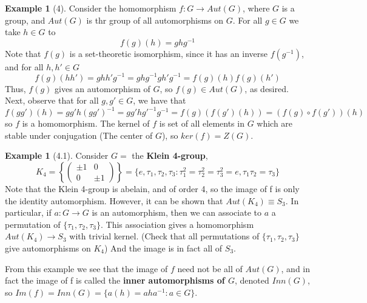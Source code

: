 \documentclass[12pt]{article}
\theoremstyle{definition}
\newtheorem{eg}[thm]{Example}
\theoremstyle{remark}
\numberwithin{equation}{section}
\newcommand\B[1]{\textbf{ #1}}
\begin{document}
\begin{eg}[4]
        Consider the homomorphism $f: G \rightarrow Aut(G)$, where $G$ is a group, and $Aut(G)$ is thr group of all automorphisms on $G$. For all $g \in G$ we take $h\in G$ to \begin{equation}
                f(g)(h) = ghg^{-1}
        \end{equation}
        Note that $f(g)$ is a set-theoretic isomorphism, since it has an inverse $f(g^{-1})$, and for all $h,h' \in G$ $$f(g)(hh') = ghh'g^{-1} = ghg^{-1}gh'g^{-1} = f(g)(h)f(g)(h')$$
        Thus, $f(g)$ gives an automorphism of $G$, so $f(g) \in Aut(G)$, as desired. Next, observe that for all $g,g' \in G$, we have that \begin{equation*}
                f(gg')(h) = gg'h(gg')^{-1} = gg'h{g'}^{-1}g^{-1} = f(g)(f(g')(h)) = (f(g)\circ f(g'))(h)
        \end{equation*}
        so $f$ is a homomorphism. The kernel of $f$ is set of all elements in $G$ which are stable under conjugation (The center of $G$), so $ker(f) =Z(G)$. 
        \begin{eg}[4.1]
                Consider $G = $ the \B{Klein 4-group}, \begin{equation*}
                        K_4 = \left\{ \begin{pmatrix} \pm 1 & 0 \\ 0 & \pm 1 \end{pmatrix} \right\} = \{e, \tau_1,\tau_2,\tau_3: \tau_1^2=\tau_2^2=\tau_3^2=e, \tau_1\tau_2 = \tau_3\}
                \end{equation*}
                Note that the Klein 4-group is abelain, and of order 4, so the image of f is only the identity automorphism. However, it can be shown that $Aut(K_4) \equiv S_3$. In particular, if $a: G \rightarrow G$ is an automorphism, then we can associate to $a$ a permutation of $\{\tau_1,\tau_2,\tau_3\}$. This association gives a homomorphism $Aut(K_4) \rightarrow S_3$ with trivial kernel. (Check that all permutations of $\{\tau_1,\tau_2,\tau_3\}$ give automorphisms on $K_4$) And the image is in fact all of $S_3$.
        \end{eg}
        From this example we see that the image of $f$ need not be all of $Aut(G)$, and in fact the image of f is called the \B{inner automorphisms of $G$}, denoted $Inn(G)$, so $Im(f) = Inn(G) = \{a(h) = aha^{-1}: a \in G\}$.
\end{eg}


\vspace{15pt}
\end{document}
